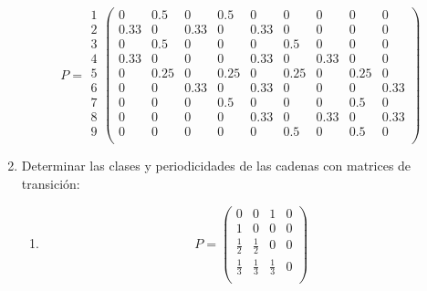 \documentclass{templateNote}
\begin{document}
\begin{enumerate}
    \begin{center}
        \[
        P = 
        \begin{array}{l}
        \text{1} \\
        \text{2} \\
        \text{3} \\
        \text{4} \\
        \text{5} \\
        \text{6} \\
        \text{7} \\
        \text{8} \\
        \text{9} \\
        \end{array}
        \left(
        \begin{array}{ccccccccc}
            0 & 0.5 & 0 & 0.5 & 0 & 0 & 0 & 0 & 0\\
            0.33 & 0 & 0.33 & 0 & 0.33 & 0 & 0 & 0 & 0\\
            0 & 0.5 & 0 & 0 & 0 & 0.5 & 0 & 0 & 0\\
            0.33 & 0 & 0 & 0 & 0.33 & 0 & 0.33 & 0 & 0\\
            0 & 0.25 & 0 & 0.25 & 0 & 0.25 & 0 & 0.25 & 0\\
            0 & 0 & 0.33 & 0 & 0.33 & 0 & 0 & 0 & 0.33\\
            0 & 0 & 0 & 0.5 & 0 & 0 & 0 & 0.5 & 0\\
            0 & 0 & 0 & 0 & 0.33 & 0 & 0.33 & 0 & 0.33\\
            0 & 0 & 0 & 0 & 0 & 0.5 & 0 & 0.5 & 0\\
        \end{array}
        \right)
        \]
    \end{center}

    \newpage
    \item Determinar las clases y periodicidades de las cadenas con matrices de transición:
    \begin{enumerate}[label=\alph*)]
        \item
        \[
        P = \left(
        \begin{array}{cccc}
            0           & 0           & 1           & 0\\
            1           & 0           & 0           & 0\\
            \frac{1}{2} & \frac{1}{2} & 0           & 0\\
            \frac{1}{3} & \frac{1}{3} & \frac{1}{3} & 0\\
        \end{array}
        \right)
        \]




\end{enumerate}
\end{enumerate}
\end{document}
